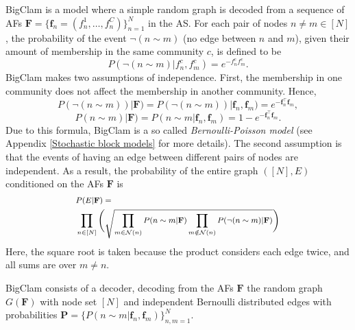 \documentclass{article}
\theoremstyle{plain}
\theoremstyle{definition}
\theoremstyle{remark}
\begin{document}
BigClam is a model where a simple random graph is decoded from a sequence of AFs $\mathbf{F}= \{\mathbf{f}_n=(f_n^1,\ldots,f_n^C)\}_{n=1}^N$ in the AS. For each pair of nodes $n\neq m\in[N]$, the probability of the event $\neg (n\sim m)$ (no edge between $n$ and $m$), given their amount of membership in the same community $c$, is defined to be
\[
P(\neg (n\sim m)|f^c_n, f^c_m) = e^{-f^c_n f^c_m}.
\]
BigClam makes two assumptions of independence. First, the membership in one community does not affect the membership in another community. Hence,
\begin{equation}
\label{eq:ClamEdge}
    P(\neg (n\sim m))|\mathbf{F})=P(\neg (n\sim m))|\mathbf{f}_n, \mathbf{f}_m)=e^{-\mathbf{f}_n^{\top }\mathbf{f}_m},
\end{equation}
\[P(n\sim m)|\mathbf{F})=P(n\sim m|\mathbf{f}_n, \mathbf{f}_m)=1-e^{-\mathbf{f}_n^{\top }\mathbf{f}_m}.\]
Due to this formula, BigClam is a so called \emph{Bernoulli-Poisson model} 
(see Appendix \ref{Stochastic block models}  for more details).
The second assumption is that the events of having an edge between different pairs of nodes are independent.  As a result, the probability of the entire graph $([N],E)$ conditioned on the AFs $\mathbf{F}$ is
\begingroup
\begin{equation}
\footnotesize
\begin{aligned}
   &  P(E|\mathbf{F}) =\\
   &  \prod_{n \in [N]}\Bigg(
        \sqrt{\prod_{m \in \mathcal{N}(n)}P( n\sim m|\mathbf{F})\prod_{m \notin \mathcal{N}(n)} P(\neg (n\sim m)|\mathbf{F})}\Bigg)
\end{aligned}
\label{eqn:clam_prob}
\end{equation}
\endgroup
Here, the square root is taken because the product considers each edge twice, and all sums are over $m\neq n$.

BigClam consists of a decoder, decoding from the AFs $\mathbf{F}$ the random graph $G(\mathbf{F})$ with node set $[N]$ and independent Bernoulli distributed edges with probabilities $\mathbf{P}=\{P(n\sim m|\mathbf{f}_n, \mathbf{f}_m)\}_{n,m=1}^N$.
\end{document}

